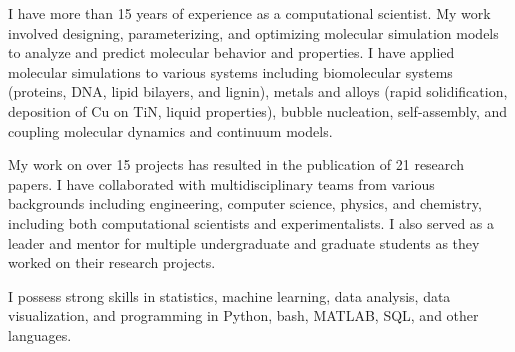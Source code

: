 
\begin{cventries}
  \cventry
    {}
    {}
    {}
    {}
    {
        \begin{cvitems}
            \item {I have more than 15 years of experience as a computational scientist. My work involved designing, parameterizing, and optimizing molecular simulation models to analyze and predict molecular behavior and properties. I have applied molecular simulations to various systems including biomolecular systems (proteins, DNA, lipid bilayers, and lignin), metals and alloys (rapid solidification, deposition of Cu on TiN, liquid properties), bubble nucleation, self-assembly, and coupling molecular dynamics and continuum models.}
            \item {My work on over 15 projects has resulted in the publication of 21 research papers. I have collaborated with multidisciplinary teams from various backgrounds including engineering, computer science, physics, and chemistry, including both computational scientists and experimentalists. I also served as a leader and mentor for multiple undergraduate and graduate students as they worked on their research projects.}
            \item {I possess strong skills in statistics, machine learning, data analysis, data visualization, and programming in Python, bash, MATLAB, SQL, and other languages.}
        \end{cvitems}
    }
\end{cventries}